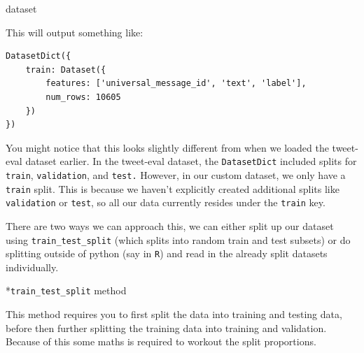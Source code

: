 \documentclass[
  letterpaper,
  DIV=11,
  numbers=noendperiod]{scrreprt}
\newenvironment{Shaded}{\begin{snugshade}}{\end{snugshade}}
\newcommand{\NormalTok}[1]{\textcolor[rgb]{0.00,0.23,0.31}{#1}}
\begin{document}
\begin{Shaded}
\begin{Highlighting}[]
\NormalTok{dataset}
\end{Highlighting}
\end{Shaded}

This will output something like:

\begin{verbatim}
DatasetDict({
    train: Dataset({
        features: ['universal_message_id', 'text', 'label'],
        num_rows: 10605
    })
})
\end{verbatim}

You might notice that this looks slightly different from when we loaded
the tweet-eval dataset earlier. In the tweet-eval dataset, the
\texttt{DatasetDict} included splits for \texttt{train},
\texttt{validation}, and \texttt{test.} However, in our custom dataset,
we only have a \texttt{train} split. This is because we haven't
explicitly created additional splits like \texttt{validation} or
\texttt{test}, so all our data currently resides under the
\texttt{train} key.

There are two ways we can approach this, we can either split up our
dataset using \texttt{train\_test\_split} (which splits into random
train and test subsets) or do splitting outside of python (say in
\texttt{R}) and read in the already split datasets individually.

*\texttt{train\_test\_split} method

This method requires you to first split the data into training and
testing data, before then further splitting the training data into
training and validation. Because of this some maths is required to
workout the split proportions.
\end{document}
